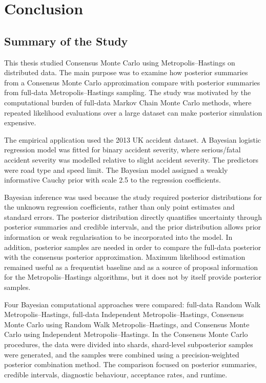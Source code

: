 \chapter{Conclusion}

\section{Summary of the Study}

This thesis studied Consensus Monte Carlo using Metropolis--Hastings on distributed data. The main purpose was to examine how posterior summaries from a Consensus Monte Carlo approximation compare with posterior summaries from full-data Metropolis--Hastings sampling. The study was motivated by the computational burden of full-data Markov Chain Monte Carlo methods, where repeated likelihood evaluations over a large dataset can make posterior simulation expensive.

The empirical application used the 2013 UK accident dataset. A Bayesian logistic regression model was fitted for binary accident severity, where serious/fatal accident severity was modelled relative to slight accident severity. The predictors were road type and speed limit. The Bayesian model assigned a weakly informative Cauchy prior with scale 2.5 to the regression coefficients.

Bayesian inference was used because the study required posterior distributions for the unknown regression coefficients, rather than only point estimates and standard errors. The posterior distribution directly quantifies uncertainty through posterior summaries and credible intervals, and the prior distribution allows prior information or weak regularisation to be incorporated into the model. In addition, posterior samples are needed in order to compare the full-data posterior with the consensus posterior approximation. Maximum likelihood estimation remained useful as a frequentist baseline and as a source of proposal information for the Metropolis--Hastings algorithms, but it does not by itself provide posterior samples.

Four Bayesian computational approaches were compared: full-data Random Walk Metropolis--Hastings, full-data Independent Metropolis--Hastings, Consensus Monte Carlo using Random Walk Metropolis--Hastings, and Consensus Monte Carlo using Independent Metropolis--Hastings. In the Consensus Monte Carlo procedures, the data were divided into shards, shard-level subposterior samples were generated, and the samples were combined using a precision-weighted posterior combination method. The comparison focused on posterior summaries, credible intervals, diagnostic behaviour, acceptance rates, and runtime.

